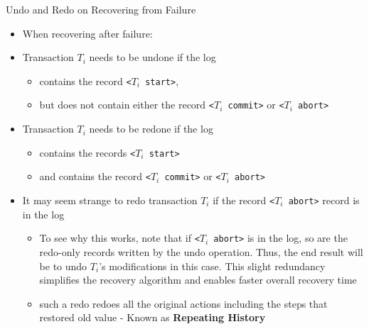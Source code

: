 \documentclass[aspectratio=169, xcolor=dvipsnames]{beamer}
\begin{document}
\begin{frame}{Undo and Redo on Recovering from Failure}
    \begin{itemize}[<+->]
        \item When recovering after failure:
        \item Transaction $T_i$ needs to be undone if the log
        \begin{itemize}
            \item[$\triangleright$] contains the record \texttt{<$T_i$ start>},
            \item[$\triangleright$] but does not contain either the record \texttt{<$T_i$ commit>} or \texttt{<$T_i$ abort>}
        \end{itemize}
        \item Transaction $T_i$ needs to be redone if the log
        \begin{itemize}
            \item[$\triangleright$] contains the records \texttt{<$T_i$ start>}
            \item[$\triangleright$] and contains the record \texttt{<$T_i$ commit>} or \texttt{<$T_i$ abort>}
        \end{itemize}
        \item It may seem strange to redo transaction $T_i$ if the record \texttt{<$T_i$ abort>} record is in the log
        \begin{itemize}
            \item[$\triangleright$] To see why this works, note that if \texttt{<$T_i$ abort>} is in the log, so are the redo-only records written by the undo operation. Thus, the end result will be to undo $T_i$'s modifications in this case. This slight redundancy simplifies the recovery algorithm and enables faster overall recovery time
            \item[$\triangleright$] such a redo redoes all the original actions including the steps that restored old value - Known as \textbf{Repeating History}
        \end{itemize}
    \end{itemize}
\end{frame}
\end{document}
